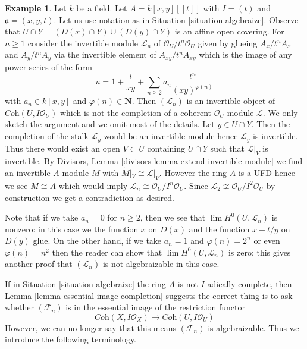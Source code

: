 \documentclass[10pt,a4paper]{amsart}
\theoremstyle{plain}
\theoremstyle{definition}
\newtheorem{example}[subsection]{Example}
\theoremstyle{remark}
\numberwithin{equation}{subsection}
\def\lim{\mathop{\mathrm{lim}}\nolimits}
\begin{document}
\begin{example}
\label{example-not-algebraizable}
Let $k$ be a field. Let $A = k[x, y][[t]]$ with $I = (t)$ and
$\mathfrak a = (x, y, t)$. Let us use notation as in
Situation \ref{situation-algebraize}. Observe that
$U \cap Y = (D(x) \cap Y) \cup (D(y) \cap Y)$ is an affine
open covering. For $n \geq 1$ consider the invertible
module $\mathcal{L}_n$ of $\mathcal{O}_U/t^n\mathcal{O}_U$
given by glueing $A_x/t^nA_x$ and $A_y/t^nA_y$ via the invertible
element of $A_{xy}/t^nA_{xy}$ which is the image of any power series
of the form
$$
u = 1 + \frac{t}{xy} + \sum_{n \geq 2} a_n \frac{t^n}{(xy)^{\varphi(n)}}
$$
with $a_n \in k[x, y]$ and $\varphi(n) \in \mathbf{N}$.
Then $(\mathcal{L}_n)$ is an invertible object of
$\textit{Coh}(U, I\mathcal{O}_U)$ which is not the
completion of a coherent $\mathcal{O}_U$-module $\mathcal{L}$.
We only sketch the argument and we omit most of the details.
Let $y \in U \cap Y$. Then the completion of the stalk
$\mathcal{L}_y$ would be an invertible module hence $\mathcal{L}_y$
is invertible. Thus there would exist an open $V \subset U$
containing $U \cap Y$ such that $\mathcal{L}|_V$ is invertible.
By Divisors, Lemma \ref{divisors-lemma-extend-invertible-module}
we find an invertible $A$-module $M$ with
$\widetilde{M}|_V \cong \mathcal{L}|_V$. However the ring $A$
is a UFD hence we see $M \cong A$ which would imply
$\mathcal{L}_n \cong \mathcal{O}_U/I^n\mathcal{O}_U$.
Since $\mathcal{L}_2 \not \cong \mathcal{O}_U/I^2\mathcal{O}_U$
by construction we get a contradiction as desired.

\medskip\noindent
Note that if we take $a_n = 0$ for $n \geq 2$, then we see
that $\lim H^0(U, \mathcal{L}_n)$ is nonzero: in this case
we the function $x$ on $D(x)$ and the function $x + t/y$ on $D(y)$
glue. On the other hand, if we take $a_n = 1$ and $\varphi(n) = 2^n$
or even $\varphi(n) = n^2$ then the reader can show that
$\lim H^0(U, \mathcal{L}_n)$ is zero; this gives another proof
that $(\mathcal{L}_n)$ is not algebraizable in this case.
\end{example}

\noindent
If in Situation \ref{situation-algebraize} the ring $A$ is not
$I$-adically complete, then Lemma \ref{lemma-essential-image-completion}
suggests the correct thing is to ask whether $(\mathcal{F}_n)$
is in the essential image of the restriction functor
$$
\textit{Coh}(X, I\mathcal{O}_X)
\longrightarrow
\textit{Coh}(U, I\mathcal{O}_U)
$$
However, we can no longer say that this means $(\mathcal{F}_n)$
is algebraizable. Thus we introduce the following terminology.
\end{document}
